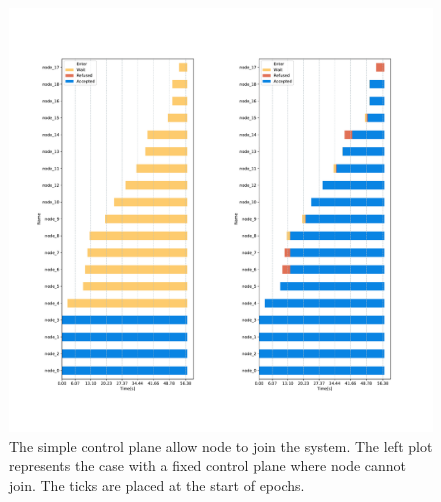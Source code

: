 \documentclass[a4paper,11pt,oneside]{report}
\begin{document}
\begin{figure}[!h] 
\centering
\includegraphics[width=450pt]{figures/JoinSubplots}
\caption{The simple control plane allow node to join the system. The left plot represents the case with a fixed control plane where node cannot join. The ticks are placed at the start of epochs. }
\label{fig:insertion-comparision}
\end{figure}
\end{document}

